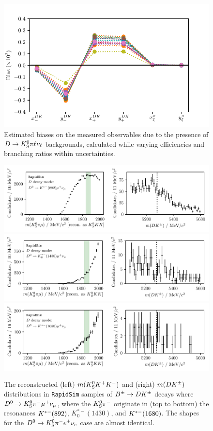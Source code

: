 \begin{figure}[tb]
    \centering
    \includegraphics[width=0.65\columnwidth]{figures/analysis/background_checks/D2Kstmunu_biases.pdf}
    \caption{Estimated biases on the measured observables due to the presence of ${D}\rightarrow{\ensuremath{{K}^0_{\mathrm{S}}}}\pi\ell\nu_\ell$ backgrounds, calculated while varying efficiencies and branching ratios within uncertainties.}
    \label{fig:d2kstmunu_biases}
\end{figure}

\begin{figure}[tbp]
    \centering
    \includegraphics[width=0.8\columnwidth]{figures/analysis/background_checks/semilep_D_mu_892_KsKK.pdf}
    \includegraphics[width=0.8\columnwidth]{figures/analysis/background_checks/semilep_D_mu_1430_KsKK.pdf}
    \includegraphics[width=0.8\columnwidth]{figures/analysis/background_checks/semilep_D_mu_1680_KsKK.pdf}
    \caption{The reconstructed (left) $m({{K}^0_{\mathrm{S}}} K^+ K^-)$ and (right) $m(D{{K}^\pm})$ distributions in \texttt{RapidSim} samples of ${{B}^\pm}\rightarrow{\ensuremath{D}} {\ensuremath{{K}^\pm}}$ decays where ${{D}^0}\rightarrow{\ensuremath{{K}^0_{\mathrm{S}}}}\pi^-\mu^+\nu_\mu$, where the ${{K}^0_{\mathrm{S}}}{{\pi}^-}$ originate in (top to bottom) the resonances ${{K}^{*-}}(892)$, $K^{*-}_0(1430)$, and ${{K}^{*-}}(1680)$. The shapes for the ${{D}^0}\rightarrow{\ensuremath{{K}^0_{\mathrm{S}}}}\pi^-e^+\nu_e$ case are almost identical.}
    \label{fig:semileptonic_D_decays_kskk}
\end{figure}


